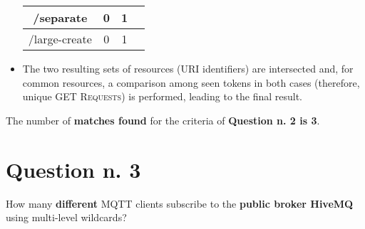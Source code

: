 \documentclass[a4paper,11pt]{article} %
\begin{document}
\begin{itemize}
\begin{center}
\begin{tabular}{|c|c|c|c|}
                \hline
                /separate       & 0                    & 1                        \\
                \hline
                /large-create   & 0                    & 1                        \\
                \hline
            \end{tabular}
        \end{center}
        \item The two resulting sets of resources (\textsc{URI} identifiers) are intersected and, for common resources, a comparison among seen tokens in both cases (therefore, unique \textsc{GET Requests}) is performed, leading to the final result.
    \end{itemize}

    The number of \textbf{matches found} for the criteria of \textbf{Question n. 2 is 3}.


    \section{Question n. 3}\label{sec:question-n.-3}
    How many \textbf{different} MQTT clients subscribe to the \textbf{public broker HiveMQ} using multi-level wildcards?

    \medskip
\end{document}
